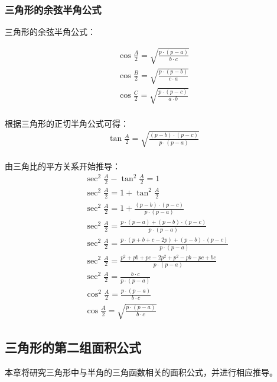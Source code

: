 \documentclass[UTF8]{ctexart}
\begin{document}
\subsubsection{三角形的余弦半角公式}
    三角形的余弦半角公式：
    \begin{large}
        \begin{align*}
            \cos{\frac{A}{2}}=\sqrt{\frac{p\cdot(p-a)}{b\cdot c}}\\[3mm]
            \cos{\frac{B}{2}}=\sqrt{\frac{p\cdot(p-b)}{c\cdot a}}\\[3mm]
            \cos{\frac{C}{2}}=\sqrt{\frac{p\cdot(p-c)}{a\cdot b}}\\[3mm]
        \end{align*}
    \end{large}
    根据三角形的正切半角公式可得：
    \setcounter{equation}{0}
    \begin{align}
        \tan{\frac{A}{2}}=\sqrt{\frac{(p-b)\cdot(p-c)}{p\cdot(p-a)}}
    \end{align}\\
    由三角比的平方关系开始推导：
    \begin{align}
        &\sec^2{\frac{A}{2}}-\tan^2{\frac{A}{2}}=1\\[3mm]
        &\sec^2{\frac{A}{2}}=1+\tan^2{\frac{A}{2}}\\[3mm]
        &\sec^2{\frac{A}{2}}=1+\frac{(p-b)\cdot(p-c)}{p\cdot(p-a)}\\[3mm]
        &\sec^2{\frac{A}{2}}=\frac{p\cdot(p-a)+(p-b)\cdot(p-c)}{p\cdot(p-a)}\\[3mm]
        &\sec^2{\frac{A}{2}}=\frac{p\cdot(p+b+c-2p)+(p-b)\cdot(p-c)}{p\cdot(p-a)}\\[3mm]
        &\sec^2{\frac{A}{2}}=\frac{p^2+pb+pc-2p^2+p^2-pb-pc+bc}{p\cdot(p-a)}\\[3mm]
        &\sec^2{\frac{A}{2}}=\frac{b\cdot c}{p\cdot(p-a)}\\[3mm]
        &\cos^2{\frac{A}{2}}=\frac{p\cdot(p-a)}{b\cdot c}\\[3mm]
        &\cos{\frac{A}{2}}=\sqrt{\frac{p\cdot(p-a)}{b\cdot c}}
    \end{align}

\newpage

\subsection{三角形的第二组面积公式}
    本章将研究三角形中与半角的三角函数相关的面积公式，并进行相应推导。
\end{document}

